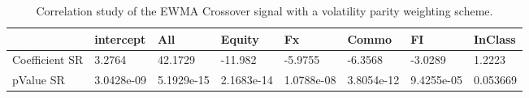 \begin{table}[H]
\centering
\begin{tabular}{llllllll}
& intercept & All & Equity & Fx & Commo & FI & InClass \\ 
\hline 
Coefficient SR & 3.2764 & 42.1729 & -11.982 & -5.9755 & -6.3568 & -3.0289 & 1.2223 \\ 
pValue SR & 3.0428e-09 & 5.1929e-15 & 2.1683e-14 & 1.0788e-08 & 3.8054e-12 & 9.4255e-05 & 0.053669 \\ 
\hline
\end{tabular}
\caption{Correlation study of the EWMA Crossover signal with a volatility parity weighting scheme.}
\label{MBBSVPNR_CORR}
\end{table}